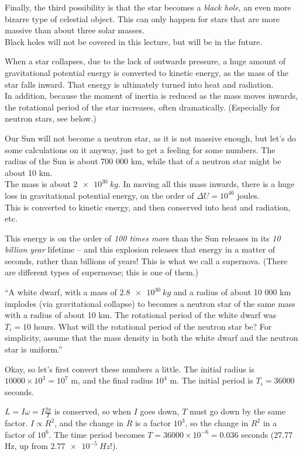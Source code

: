 \documentclass[8.01x]{subfiles}
\begin{document}
Finally, the third possibility is that the star becomes a \emph{black hole}, an even more bizarre type of celestial object. This can only happen for stars that are more massive than about three solar masses.\\
Black holes will not be covered in this lecture, but will be in the future.

When a star collapses, due to the lack of outwards pressure, a huge amount of gravitational potential energy is converted to kinetic energy, as the mass of the star falls inward. That energy is ultimately turned into heat and radiation.\\
In addition, because the moment of inertia is reduced as the mass moves inwards, the rotational period of the star increases, often dramatically. (Especially for neutron stars, see below.)

Our Sun will not become a neutron star, as it is not massive enough, but let's do some calculations on it anyway, just to get a feeling for some numbers. The radius of the Sun is about 700 000 km, while that of a neutron star might be about 10 km.\\
The mass is about $\SI{2e30}{kg}$. In moving all this mass inwards, there is a huge loss in gravitational potential energy, on the order of $\Delta U = 10^{46}$ joules.\\
This is converted to kinetic energy, and then conserved into heat and radiation, etc.

This energy is on the order of \emph{100 times more} than the Sun releases in its \emph{10 billion year} lifetime -- and this explosion releases that energy in a matter of seconds, rather than billions of years! This is what we call a supernova. (There are different types of supernovae; this is one of them.)

``A white dwarf, with a mass of $\SI{2.8e30}{kg}$ and a radius of about 10 000 km implodes (via gravitational collapse) to becomes a neutron star of the same mass with a radius of about 10 km. The rotational period of the white dwarf was $T_i = 10$ hours. What will the rotational period of the neutron star be? For simplicity, assume that the mass density in both the white dwarf and the neutron star is uniform.''

Okay, so let's first convert these numbers a little. The initial radius is $10000\times10^3 = 10^7$ m, and the final radius $10^4$ m. The initial period is $T_i = 36000$ seconds.

$\displaystyle L = I \omega = I \frac{2 \pi}{T}$ is conserved, so when $I$ goes down, $T$ must go down by the same factor. $I \propto R^2$, and the change in $R$ is a factor $10^3$, so the change in $R^2$ in a factor of $10^6$. The time period becomes $T = 36000 \times 10^{-6} = 0.036$ seconds (27.77 Hz, up from $\SI{2.77e-5}{Hz}$!).
\end{document}
